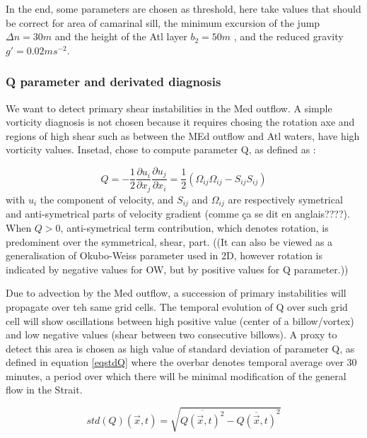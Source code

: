 In the end, some parameters are chosen as threshold, here take values that should be correct for area of camarinal sill, the minimum excursion of the jump $\Delta n = 30m$ and the height of the Atl layer $b_2=50 m$ , and the reduced gravity $g'=0.02 m s^{-2}$.

\subsubsection{Q parameter and derivated diagnosis}

We want to detect primary shear instabilities in the Med outflow. A simple vorticity diagnosis is not chosen because it requires chosing the rotation axe and regions of high shear such as between the MEd outflow and Atl waters, have high vorticity values. Insetad, chose to compute parameter Q, as defined as :

\begin{equation}
Q=-\frac{1}{2} \frac{\partial u_i}{\partial x_j} \frac{\partial u_j}{\partial x_i} = \frac{1}{2} (\Omega_{ij}\Omega_{ij} - S_{ij} S_{ij})
\end{equation}
with $u_i$ the component of velocity, and $S_{ij}$ and $\Omega_{ij}$ are respectively symetrical and anti-symetrical parts of velocity gradient (comme ça se dit en anglais????). When $Q>0$, anti-symetrical term contribution, which denotes rotation, is predominent over the symmetrical, shear, part. ((It can also be viewed as a generalisation of Okubo-Weiss parameter used in 2D, however rotation is indicated by negative values for OW, but by positive values for Q parameter.))



Due to advection by the Med outflow, a succession of primary instabilities will propagate over teh same grid cells. The temporal evolution of Q over such grid cell will show oscillations between high positive value (center of a billow/vortex) and low negative values (shear between two consecutive billows). A proxy to detect this area is chosen as high value of standard deviation of parameter Q, as defined in equation \ref{eqstdQ} where the overbar denotes temporal average over 30 minutes, a period over which there will be minimal modification of the general flow in the Strait.

\begin{equation} 
\label{eqstdQ} 
    std ( Q ) (\vec{x},t)=  \sqrt{   \overline{Q (\vec{x},t)^{2}} -  \overline{Q(\vec{x},t)}^{2}  }
\end{equation}

